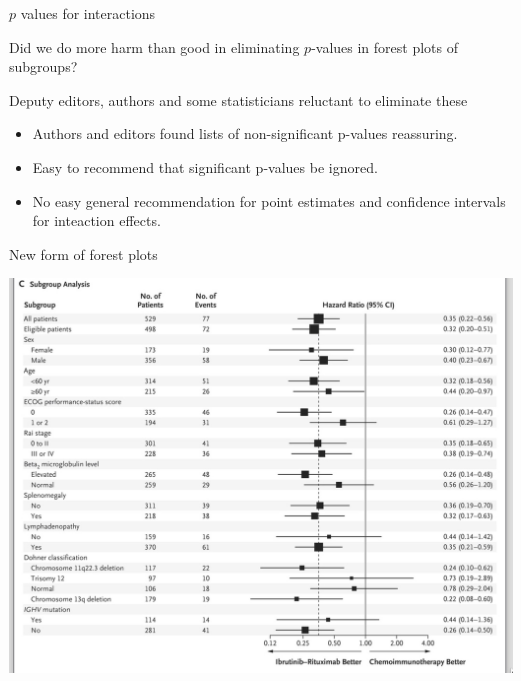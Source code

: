\documentclass[ignorenonframetext,]{beamer}
\begin{document}
\begin{frame}{\(p\) values for interactions}
\protect\hypertarget{p-values-for-interactions}{}

Did we do more harm than good in eliminating \(p\)-values in forest
plots of subgroups?

Deputy editors, authors and some statisticians reluctant to eliminate
these

\begin{itemize}
\item
  Authors and editors found lists of non-significant p-values
  reassuring.
\item
  Easy to recommend that significant p-values be ignored.
\item
  No easy general recommendation for point estimates and confidence
  intervals for inteaction effects.
\end{itemize}

\end{frame}

\begin{frame}{New form of forest plots}
\protect\hypertarget{new-form-of-forest-plots}{}

\centering

\includegraphics{../figures/shanafelt_subgroups.jpeg}

\end{frame}
\end{document}
